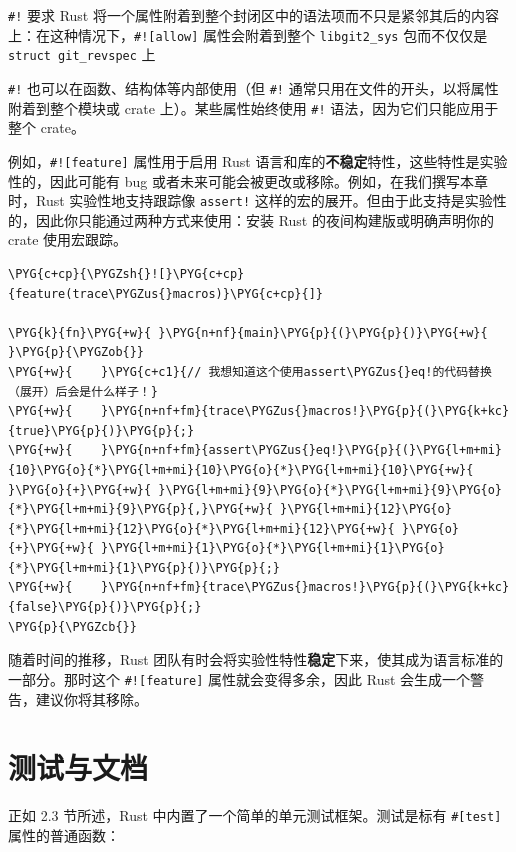 \texttt{\#!} 要求 Rust 将一个属性附着到整个封闭区中的语法项而不只是紧邻其后的内容上：在这种情况下，\texttt{\#![allow]} 属性会附着到整个 \texttt{libgit2\_sys} 包而不仅仅是 \texttt{struct git\_revspec} 上

\texttt{\#!} 也可以在函数、结构体等内部使用（但 \texttt{\#!} 通常只用在文件的开头，以将属性附着到整个模块或 crate 上）。某些属性始终使用 \texttt{\#!} 语法，因为它们只能应用于整个 crate。

例如，\texttt{\#![feature]} 属性用于启用 Rust 语言和库的\textbf{不稳定}特性，这些特性是实验性的，因此可能有 bug 或者未来可能会被更改或移除。例如，在我们撰写本章时，Rust 实验性地支持跟踪像 \texttt{assert!} 这样的宏的展开。但由于此支持是实验性的，因此你只能通过两种方式来使用：安装 Rust 的夜间构建版或明确声明你的 crate 使用宏跟踪。

\begin{Verbatim}[commandchars=\\\{\},breaklines=true,breakanywhere=true,fontsize=\codefont,xleftmargin=17bp]
\PYG{c+cp}{\PYGZsh{}![}\PYG{c+cp}{feature(trace\PYGZus{}macros)}\PYG{c+cp}{]}

\PYG{k}{fn}\PYG{+w}{ }\PYG{n+nf}{main}\PYG{p}{(}\PYG{p}{)}\PYG{+w}{ }\PYG{p}{\PYGZob{}}
\PYG{+w}{    }\PYG{c+c1}{// 我想知道这个使用assert\PYGZus{}eq!的代码替换（展开）后会是什么样子！}
\PYG{+w}{    }\PYG{n+nf+fm}{trace\PYGZus{}macros!}\PYG{p}{(}\PYG{k+kc}{true}\PYG{p}{)}\PYG{p}{;}
\PYG{+w}{    }\PYG{n+nf+fm}{assert\PYGZus{}eq!}\PYG{p}{(}\PYG{l+m+mi}{10}\PYG{o}{*}\PYG{l+m+mi}{10}\PYG{o}{*}\PYG{l+m+mi}{10}\PYG{+w}{ }\PYG{o}{+}\PYG{+w}{ }\PYG{l+m+mi}{9}\PYG{o}{*}\PYG{l+m+mi}{9}\PYG{o}{*}\PYG{l+m+mi}{9}\PYG{p}{,}\PYG{+w}{ }\PYG{l+m+mi}{12}\PYG{o}{*}\PYG{l+m+mi}{12}\PYG{o}{*}\PYG{l+m+mi}{12}\PYG{+w}{ }\PYG{o}{+}\PYG{+w}{ }\PYG{l+m+mi}{1}\PYG{o}{*}\PYG{l+m+mi}{1}\PYG{o}{*}\PYG{l+m+mi}{1}\PYG{p}{)}\PYG{p}{;}
\PYG{+w}{    }\PYG{n+nf+fm}{trace\PYGZus{}macros!}\PYG{p}{(}\PYG{k+kc}{false}\PYG{p}{)}\PYG{p}{;}
\PYG{p}{\PYGZcb{}}
\end{Verbatim}

随着时间的推移，Rust 团队有时会将实验性特性\textbf{稳定}下来，使其成为语言标准的一部分。那时这个 \texttt{\#![feature]} 属性就会变得多余，因此 Rust 会生成一个警告，建议你将其移除。

\section{测试与文档}

正如 2.3 节所述，Rust 中内置了一个简单的单元测试框架。测试是标有 \texttt{\#[test]} 属性的普通函数：

